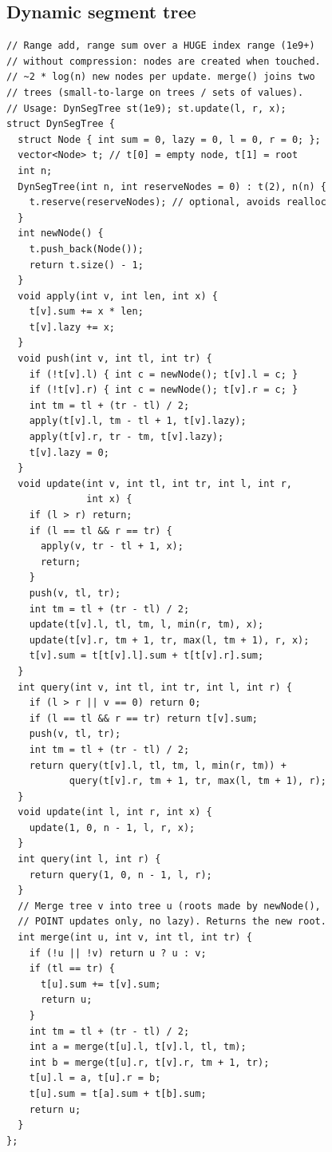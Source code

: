 \documentclass[8pt, a4paper]{article}
\begin{document}
\begin{multicols*}{3}
\subsection{Dynamic segment tree}
\begin{lstlisting}
// Range add, range sum over a HUGE index range (1e9+)
// without compression: nodes are created when touched.
// ~2 * log(n) new nodes per update. merge() joins two
// trees (small-to-large on trees / sets of values).
// Usage: DynSegTree st(1e9); st.update(l, r, x);
struct DynSegTree {
  struct Node { int sum = 0, lazy = 0, l = 0, r = 0; };
  vector<Node> t; // t[0] = empty node, t[1] = root
  int n;
  DynSegTree(int n, int reserveNodes = 0) : t(2), n(n) {
    t.reserve(reserveNodes); // optional, avoids realloc
  }
  int newNode() {
    t.push_back(Node());
    return t.size() - 1;
  }
  void apply(int v, int len, int x) {
    t[v].sum += x * len;
    t[v].lazy += x;
  }
  void push(int v, int tl, int tr) {
    if (!t[v].l) { int c = newNode(); t[v].l = c; }
    if (!t[v].r) { int c = newNode(); t[v].r = c; }
    int tm = tl + (tr - tl) / 2;
    apply(t[v].l, tm - tl + 1, t[v].lazy);
    apply(t[v].r, tr - tm, t[v].lazy);
    t[v].lazy = 0;
  }
  void update(int v, int tl, int tr, int l, int r,
              int x) {
    if (l > r) return;
    if (l == tl && r == tr) {
      apply(v, tr - tl + 1, x);
      return;
    }
    push(v, tl, tr);
    int tm = tl + (tr - tl) / 2;
    update(t[v].l, tl, tm, l, min(r, tm), x);
    update(t[v].r, tm + 1, tr, max(l, tm + 1), r, x);
    t[v].sum = t[t[v].l].sum + t[t[v].r].sum;
  }
  int query(int v, int tl, int tr, int l, int r) {
    if (l > r || v == 0) return 0;
    if (l == tl && r == tr) return t[v].sum;
    push(v, tl, tr);
    int tm = tl + (tr - tl) / 2;
    return query(t[v].l, tl, tm, l, min(r, tm)) +
           query(t[v].r, tm + 1, tr, max(l, tm + 1), r);
  }
  void update(int l, int r, int x) {
    update(1, 0, n - 1, l, r, x);
  }
  int query(int l, int r) {
    return query(1, 0, n - 1, l, r);
  }
  // Merge tree v into tree u (roots made by newNode(),
  // POINT updates only, no lazy). Returns the new root.
  int merge(int u, int v, int tl, int tr) {
    if (!u || !v) return u ? u : v;
    if (tl == tr) {
      t[u].sum += t[v].sum;
      return u;
    }
    int tm = tl + (tr - tl) / 2;
    int a = merge(t[u].l, t[v].l, tl, tm);
    int b = merge(t[u].r, t[v].r, tm + 1, tr);
    t[u].l = a, t[u].r = b;
    t[u].sum = t[a].sum + t[b].sum;
    return u;
  }
};
\end{lstlisting}

\end{multicols*}
\end{document}
